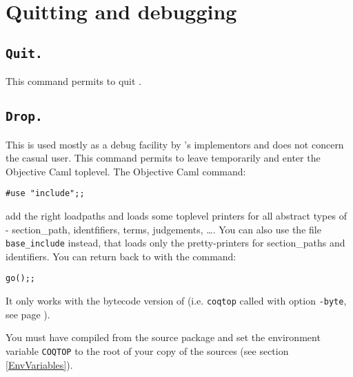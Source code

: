 \section{Quitting and debugging}

\subsection[\tt Quit.]{\tt Quit.}
This command permits to quit \Coq.

\subsection[\tt Drop.]{\tt Drop.\label{Drop}}

This is used mostly as a debug facility by \Coq's implementors
and does not concern the casual user.
This command permits to leave {\Coq} temporarily and enter the
Objective Caml toplevel. The Objective Caml command:

\begin{flushleft}
\begin{verbatim}
#use "include";;
\end{verbatim}
\end{flushleft}

\noindent add the right loadpaths and loads some toplevel printers for
all abstract types of \Coq - section\_path, identfifiers, terms, judgements,
\dots. You can also use the file \texttt{base\_include} instead,
that loads only the pretty-printers for section\_paths and
identifiers.
You can return back to \Coq{} with the command: 

\begin{flushleft}
\begin{verbatim}
go();;
\end{verbatim}
\end{flushleft}

\begin{Warnings}
\item It only works with the bytecode version of {\Coq} (i.e. {\tt coqtop} called with option {\tt -byte}, see page \pageref{binary-images}).
\item You must have compiled {\Coq} from the source package and set the
  environment variable \texttt{COQTOP} to the root of your copy of the sources (see section \ref{EnvVariables}).
\end{Warnings}

